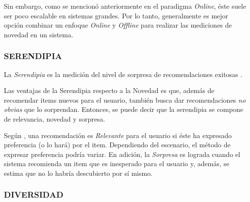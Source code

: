     Sin embargo, como se mencionó anteriormente en el paradigma \textit{Online}, éste suele ser poco escalable en sistemas grandes. Por lo tanto, generalmente es mejor opción combinar un enfoque \textit{Online} y \textit{Offline} para realizar las mediciones de novedad en un sistema.

    \subsubsection{SERENDIPIA}

    La \textit{Serendipia} es la medición del nivel de sorpresa de recomendaciones exitosas \parencite{Aggarwal2016}. 
    
    Las ventajas de la Serendipia respecto a la Novedad es que, además de recomendar items nuevos para el usuario, también busca dar recomendaciones \textit{no obvias} que lo sorprendan. Entonces, se puede decir que la serendipia se compone de relevancia, novedad y sorpresa.
    
    Según \parencite{Kotkov2020Serendipity}, una recomendación es \textit{Relevante} para el usuario si éste ha expresado preferencia (o lo hará) por el item. Dependiendo del escenario, el método de expresar preferencia podría variar. En adición, la \textit{Sorpresa} es lograda cuando el sistema recomienda un item que es inesperado para el usuario y, además, se estima que no lo habría descubierto por sí mismo.

    \newpage

    \subsubsection{DIVERSIDAD}
    








